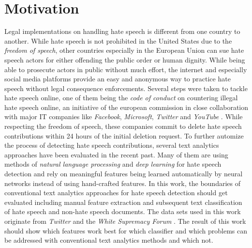 \section{Motivation}

Legal implementations on handling hate speech is different from one country to another. While hate speech is not prohibited in the United States due to the \textit{freedom of speech}, other countries especially in the European Union can sue hate speech actors for either offending the public order or human dignity. While being able to prosecute actors in public without much effort, the internet and especially social media platforms provide an easy and anonymous way to practice hate speech without legal consequence enforcements. Several steps were taken to tackle hate speech online, one of them being the \textit{code of conduct} on countering illegal hate speech online, an initiative of the european commission in close collaboration with major IT companies like \textit{Facebook}, \textit{Microsoft}, \textit{Twitter} and \textit{YouTube} \cite{EuropeanCommission.20200622}. While respecting the freedom of speech, these companies commit to delete hate speech contributions within 24 hours of the initial deletion request. To further automize the process of detecting hate speech contributions, several text analytics approaches have been evaluated in the recent past. Many of them are using methods of \textit{natural language processing} and \textit{deep learning} for hate speech detection and rely on meaningful features being learned automatically by neural networks instead of using hand-crafted features. In this work, the boundaries of conventional text analytics approaches for hate speech detection should get evaluated including manual feature extraction and subsequent text classification of hate speech and non-hate speech documents. The data sets used in this work originate from \textit{Twitter} \cite{ThomasDavidson.2020} and the \textit{White Supremacy Forum} \cite{OnadeGibert.2020}. The result of this work should show which features work best for which classifier and which problems can be addressed with conventional text analytics methods and which not. 


